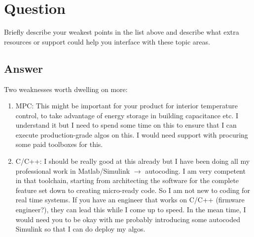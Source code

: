 \section{Question}
Briefly describe your weakest points in the list above and describe what extra resources
or support could help you interface with these topic areas.

\subsection *{Answer}

Two weaknesses worth dwelling on more:
\begin{enumerate}
  \item MPC: This might be important for your product for interior temperature control, to take advantage of energy storage in building capacitance etc. I understand it but I need to spend some time on this to ensure that I can execute production-grade algos on this. I would need support with procuring some paid toolboxes for this.
  \item C/C++: I should be really good at this already but I have been doing all my professional work in Matlab/Simulink \(\rightarrow\) autocoding. I am very competent in that toolchain, starting from architecting the software for the complete feature set down to creating micro-ready code. So I am not new to coding for real time systems. If you have an engineer that works on C/C++ (firmware engineer?), they can lead this while I come up to speed. In the mean time, I would need you to be okay with me probably introducing some autocoded Simulink so that I can do deploy my algos.
\end{enumerate}